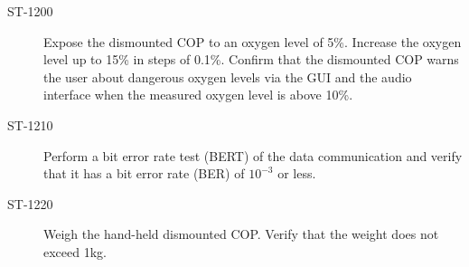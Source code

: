 \begin{description}
\item[ST-1200] Expose the dismounted COP to an oxygen level of 5\%. Increase the oxygen level up to 15\% in steps of 0.1\%. Confirm that the dismounted COP warns the user about dangerous oxygen levels via the GUI and the audio interface when the measured oxygen level is above 10\%. 

\item[ST-1210] Perform a bit error rate test (BERT) of the data communication and verify that it has a bit error rate (BER) of $10^{-3}$ or less. 

\item[ST-1220] Weigh the hand-held dismounted COP. Verify that the weight does not exceed 1kg. 

\end{description}


